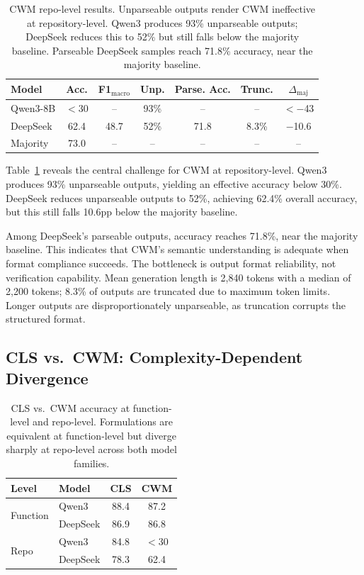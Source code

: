 \documentclass[11pt]{article}
\begin{document}
\begin{table}[t]
\centering
\small
\begin{tabular}{lcccccc}
\toprule
\textbf{Model} & \textbf{Acc.} & \textbf{F1$_\text{macro}$} & \textbf{Unp.} & \textbf{Parse. Acc.} & \textbf{Trunc.} & \textbf{$\Delta_\text{maj}$} \\
\midrule
Qwen3-8B   & $<$30  & --   & 93\% & --   & --    & $<$$-$43 \\
DeepSeek    & 62.4 & 48.7 & 52\% & 71.8 & 8.3\% & $-$10.6 \\
\midrule
Majority    & 73.0 & --   & --   & --   & --    & -- \\
\bottomrule
\end{tabular}
\caption{CWM repo-level results. Unparseable outputs render CWM ineffective at repository-level. Qwen3 produces 93\% unparseable outputs; DeepSeek reduces this to 52\% but still falls below the majority baseline. Parseable DeepSeek samples reach 71.8\% accuracy, near the majority baseline.}
\label{tab:cwm_repo}
\end{table}

Table~\ref{tab:cwm_repo} reveals the central challenge for CWM at repository-level. Qwen3 produces 93\% unparseable outputs, yielding an effective accuracy below 30\%. DeepSeek reduces unparseable outputs to 52\%, achieving 62.4\% overall accuracy, but this still falls 10.6pp below the majority baseline.

Among DeepSeek's parseable outputs, accuracy reaches 71.8\%, near the majority baseline. This indicates that CWM's semantic understanding is adequate when format compliance succeeds. The bottleneck is output format reliability, not verification capability. Mean generation length is 2,840 tokens with a median of 2,200 tokens; 8.3\% of outputs are truncated due to maximum token limits. Longer outputs are disproportionately unparseable, as truncation corrupts the structured format.

\subsection{CLS vs.\ CWM: Complexity-Dependent Divergence}

\begin{table}[t]
\centering
\small
\begin{tabular}{llcc}
\toprule
\textbf{Level} & \textbf{Model} & \textbf{CLS} & \textbf{CWM} \\
\midrule
\multirow{2}{*}{Function} & Qwen3   & 88.4 & 87.2 \\
                          & DeepSeek & 86.9 & 86.8 \\
\midrule
\multirow{2}{*}{Repo}     & Qwen3   & 84.8 & $<$30 \\
                          & DeepSeek & 78.3 & 62.4 \\
\bottomrule
\end{tabular}
\caption{CLS vs.\ CWM accuracy at function-level and repo-level. Formulations are equivalent at function-level but diverge sharply at repo-level across both model families.}
\label{tab:cls_cwm_summary}
\end{table}
\end{document}
